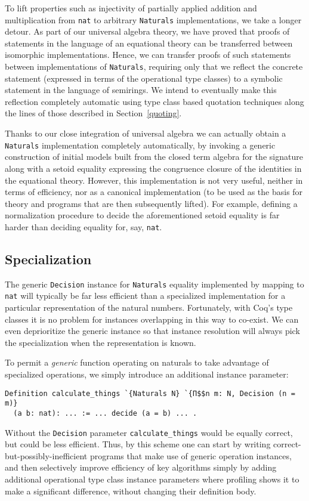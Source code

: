 \documentclass[a4paper,10pt,runningheads]{llncs}
\begin{document}
To lift properties such as injectivity of partially applied addition and multiplication from \lstinline|nat| to arbitrary \lstinline|Naturals| implementations, we take a longer detour. As part of our universal algebra theory, we have proved that proofs of statements in the language of an equational theory can be transferred between isomorphic implementations. Hence, we can transfer proofs of such statements between implementations of \lstinline|Naturals|, requiring only that we reflect the concrete statement (expressed in terms of the operational type classes) to a symbolic statement in the language of semirings. We intend to eventually make this reflection completely automatic using type class based quotation techniques along the lines of those described in Section~\ref{quoting}.

Thanks to our close integration of universal algebra we can actually obtain a \lstinline|Naturals| implementation completely automatically, by invoking a generic construction of initial models built from the closed term algebra for the signature along with a setoid equality expressing the congruence closure of the identities in the equational theory. However, this implementation is not very useful, neither in terms of efficiency, nor as a canonical implementation (to be used as the basis for theory and programs that are then subsequently lifted). For example, defining a normalization procedure to decide the aforementioned setoid equality is far harder than deciding equality for, say, \lstinline|nat|.

\subsection{Specialization}

The generic \lstinline|Decision| instance for \lstinline|Naturals| equality implemented by mapping to \lstinline|nat| will typically be far less efficient than a specialized implementation for a particular representation of the natural numbers. Fortunately, with Coq's type classes it is no problem for instances overlapping in this way to co-exist. We can even deprioritize the generic instance so that instance resolution will always pick the specialization when the representation is known.

To permit a \emph{generic} function operating on naturals to take advantage of specialized operations, we simply introduce an additional instance parameter:
\begin{lstlisting}
Definition calculate_things `{Naturals N} `{Π$$n m: N, Decision (n = m)}
  (a b: nat): ... := ... decide (a = b) ... .
\end{lstlisting}
Without the \lstinline|Decision| parameter \lstinline|calculate_things| would be equally correct, but could be less efficient. Thus, by this scheme one can start by writing correct-but-possibly-inefficient programs that make use of generic operation instances, and then selectively improve efficiency of key algorithms simply by adding additional operational type class instance parameters where profiling shows it to make a significant difference, without changing their definition body.
\end{document}
